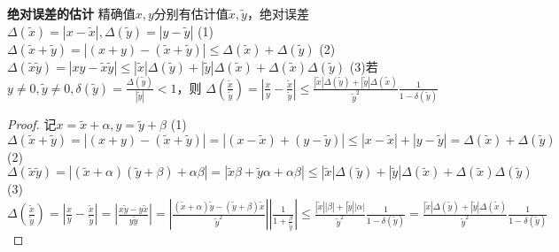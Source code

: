 \documentclass[11pt]{article}
\begin{document}
\textbf{绝对误差的估计} \newline
精确值$x,y$分别有估计值$\tilde{x},\tilde{y}$，绝对误差$\Delta(\tilde{x})=|x-\tilde{x}|,\Delta(\tilde{y})=|y-\tilde{y}|$ \newline
(1)$\Delta(\tilde{x}+\tilde{y})=|(x+y)-(\tilde{x}+\tilde{y})|\le\Delta(\tilde{x})+\Delta(\tilde{y})$ \newline
(2)$\Delta(\tilde{x}\tilde{y})=|xy-\tilde{x}\tilde{y}|\le |\tilde{x}|\Delta(\tilde{y})+|\tilde{y}|\Delta(\tilde{x})+\Delta(\tilde{x})\Delta(\tilde{y})$ \newline
(3)若$y\not=0,\tilde{y}\not=0,\delta(\tilde{y})=\frac{\Delta(\tilde{y})}{|\tilde{y}|}<1$，则  \newline
$\Delta(\frac{\tilde{x}}{\tilde{y}})=|\frac{x}{y}-\frac{\tilde{x}}{\tilde{y}}|\le \frac{|\tilde{x}|\Delta(\tilde{y})+ |\tilde{y}|\Delta(\tilde{x})}{\tilde{y}^2} \frac{1}{1-\delta(\tilde{y})}$ \newline
\begin{proof}
  记$x=\tilde{x}+\alpha, y=\tilde{y}+\beta$ \newline
  (1)$\Delta(\tilde{x}+\tilde{y})=|(x+y)-(\tilde{x}+\tilde{y})|=|(x-\tilde{x})+(y-\tilde{y})|\le |x-\tilde{x}|+|y-\tilde{y}|=\Delta(\tilde{x})+\Delta(\tilde{y})$ \newline
  (2)$\Delta(\tilde{x}\tilde{y})=|(\tilde{x}+\alpha)(\tilde{y}+\beta)+\alpha\beta|=|\tilde{x}\beta+\tilde{y}\alpha+\alpha\beta|\le |\tilde{x}|\Delta(\tilde{y})+|\tilde{y}|\Delta(\tilde{x})+\Delta(\tilde{x})\Delta(\tilde{y})$ \newline
  (3)$\Delta(\frac{\tilde{x}}{\tilde{y}})=|\frac{x}{y}-\frac{\tilde{x}}{\tilde{y}}|=|\frac{x\tilde{y}-y\tilde{x}}{y\tilde{y}}|=|\frac{(\tilde{x}+\alpha)\tilde{y}-(\tilde{y}+\beta)\tilde{x}}{\tilde{y}^2}||\frac{1}{1+\frac{\beta}{\tilde{y}}}|\le \frac{|\tilde{x}||\beta|+|\tilde{y}||\alpha|}{\tilde{y}^2} \frac{1}{1-\delta(\tilde{y})}=\frac{|\tilde{x}|\Delta(\tilde{y})+ |\tilde{y}|\Delta(\tilde{x})}{\tilde{y}^2} \frac{1}{1-\delta(\tilde{y})}$
\end{proof}
\end{document}
